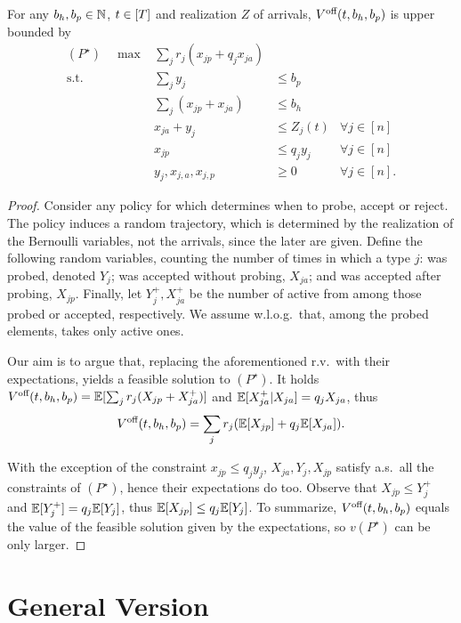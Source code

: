 \documentclass[letterpaper,11pt]{article}
\begin{document}
\begin{proposition}
For any $b_h,b_p\in\mathbb{N}$, $t\in[T]$ and realization $Z$ of arrivals, $V^{\text{off}}(t,b_h,b_p)$ is upper bounded by
\begin{equation}\label{eq:probing_relaxation}
\begin{array}{rrll}
(P^\star)\quad \max  & \sum_jr_j(x_{jp}+q_jx_{ja}) \\
\text{s.t.}& \sum_j y_j & \leq b_p \\
& \sum_j(x_{jp}+x_{ja}) &\leq b_h \\
&  x_{ja} + y_j & \leq Z_j(t)  &\forall j\in [n] \\
& x_{jp} &\leq q_jy_j & \forall j \in [n] \\
& y_j,x_{j,a},x_{j,p}&\geq 0 & \forall j\in[n].
\end{array}
\end{equation}
\end{proposition}	
\begin{proof}
Consider any policy for \off which determines when to probe, accept or reject.
The policy induces a random trajectory, which is determined by the realization of the Bernoulli variables, not the arrivals, since the later are given.
Define the following random variables, counting the number of times in which a type $j$: was probed, denoted $Y_j$; was accepted without probing, $X_{ja}$; and was accepted after probing, $X_{jp}$.
Finally, let $Y_{j}^+,X_{ja}^+$ be the number of active from among those probed or accepted, respectively.
We assume w.l.o.g.\ that, among the probed elements, \off takes only active ones.

Our aim is to argue that, replacing the aforementioned r.v.\ with their expectations, yields a feasible solution to $(P^\star)$.
It holds $V^{\text{off}}(t,b_h,b_p) = \mathbb{E}[\sum_j r_j(X_{jp}+X_{ja}^+)]$ and $\mathbb{E}[X_{ja}^+|X_{ja}]=q_jX_{ja}$, thus
\[
V^{\text{off}}(t,b_h,b_p) = \sum_jr_j(\mathbb{E}[X_{jp}]+q_j\mathbb{E}[X_{ja}]).
\] 

With the exception of the constraint $x_{jp}\leq q_jy_j$, $X_{ja},Y_j,X_{jp}$ satisfy a.s.\ all the constraints of $(P^\star)$, hence their expectations do too.
Observe that $X_{jp}\leq Y_{j}^+$ and $\mathbb{E}[Y_j^+]=q_j\mathbb{E}[Y_j]$, thus $\mathbb{E}[X_{jp}]\leq q_j\mathbb{E}[Y_j]$.
To summarize, $V^{\text{off}}(t,b_h,b_p)$ equals the value of the feasible solution given by the expectations, so $v(P^\star)$ can be only larger.
\end{proof}




\section{General Version}
\end{document}
